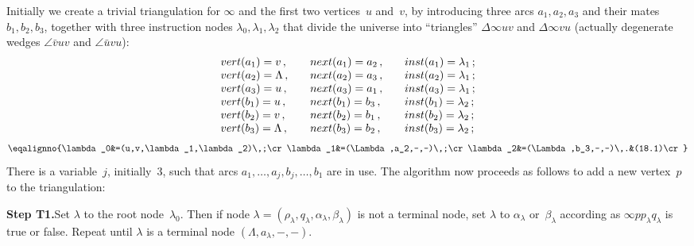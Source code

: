 Initially we create a trivial triangulation for $\infty$ and the first
two vertices~$u$ and~$v$, by introducing three arcs $a_1,a_2,a_3$ and
their mates $b_1,b_2,b_3$, together with three instruction nodes
$\lambda_0,\lambda_1,\lambda_2$ that divide the universe into
``triangles'' $\Delta\infty uv$ and $\Delta\infty vu$ (actually
degenerate wedges $\angle \bar{v}uv$ and $\angle \bar{u}vu$):
$$\vcenter{\halign{$#$\hfil\qquad&$#$\hfil\qquad&$#$\hfil\cr
{\sl vert\/}(a_1)=v\,,&{\sl next\/}(a_1)=a_2\,,&{\sl
inst\/}(a_1)=\lambda_1\,;\cr
{\sl vert\/}(a_2)=\Lambda\,,&{\sl next\/}(a_2)=a_3\,,&{\sl
inst\/}(a_2)=\lambda_1\,;\cr
{\sl vert\/}(a_3)=u\,,&{\sl next\/}(a_3)=a_1\,,&{\sl
inst\/}(a_3)=\lambda_1\,;\cr
{\sl vert\/}(b_1)=u\,,&{\sl next\/}(b_1)=b_3\,,&{\sl
inst\/}(b_1)=\lambda_2\,;\cr
{\sl vert\/}(b_2)=v\,,&{\sl next\/}(b_2)=b_1\,,&{\sl
inst\/}(b_2)=\lambda_2\,;\cr
{\sl vert\/}(b_3)=\Lambda\,,&{\sl next\/}(b_3)=b_2\,,&{\sl
inst\/}(b_3)=\lambda_2\,;\cr}}$$
\vskip-10pt
$$\eqalignno{\lambda_0&=(u,v,\lambda_1,\lambda_2)\,;\cr
\lambda_1&=(\Lambda,a_2,-,-)\,;\cr
\lambda_2&=(\Lambda,b_3,-,-)\,.&(18.1)\cr}$$
There is a variable~$j$, initially~3, such that arcs
$a_1,\ldots,a_j,b_j,\ldots,b_1$ are in use. The algorithm now proceeds
as follows to add a new vertex~$p$ to the triangulation:

\smallskip
{\bf Step T1.}\quad Set $\lambda$ to the root
node~$\lambda_0$. Then if node
$\lambda=(\rho_{\lambda},q_{\lambda},\alpha_{\lambda},\beta_{\lambda})$
is not a terminal node, set $\lambda$ to $\alpha_{\lambda}$
or~$\beta_{\lambda}$ according as $\infty pp_{\lambda}q_{\lambda}$ is
true or false. Repeat until $\lambda$ is a terminal node
$(\Lambda,a_{\lambda},-,-)$. 

